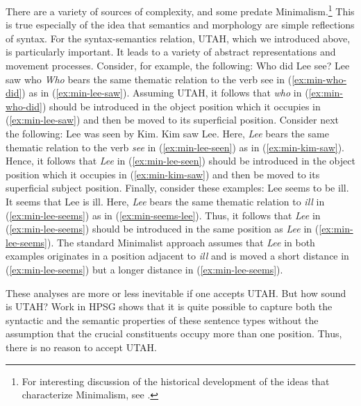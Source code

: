 \documentclass[output=paper]{langsci/langscibook}
\begin{document}
There are a variety of sources of complexity, and some predate Minimalism.\footnote{%
  For interesting discussion of the historical development of the ideas that characterize Minimalism, see \citet[Chapters~2 and~3]{CJ2005a}.%
}
This is true especially of the idea that semantics and morphology are simple reflections of syntax. For the syntax-semantics relation, UTAH, which we introduced above, is particularly important. It leads to a variety of abstract representations and movement processes. Consider, for example, the following:
\eal
\ex Who did Lee see?\label{ex:min-who-did} 
\ex Lee saw who\label{ex:min-lee-saw}
\zl
\textit{Who} bears the same thematic relation to the verb see in (\ref{ex:min-who-did}) as in (\ref{ex:min-lee-saw}). Assuming UTAH, it follows that \textit{who} in (\ref{ex:min-who-did}) should be introduced in the object position which it occupies in (\ref{ex:min-lee-saw}) and then be moved to its superficial position. Consider next the following:
\eal
\ex Lee was seen by Kim.\label{ex:min-lee-seen}
\ex Kim saw Lee.\label{ex:min-kim-saw}
\zl
Here, \textit{Lee} bears the same thematic relation to the verb \textit{see} in (\ref{ex:min-lee-seen}) as in (\ref{ex:min-kim-saw}). Hence, it follows that \textit{Lee} in (\ref{ex:min-lee-seen}) should be introduced in the object position which it occupies in (\ref{ex:min-kim-saw}) and then be moved to its superficial subject position. Finally, consider these examples:
\eal\label{ex:min-lee}
\ex Lee seems to be ill.\label{ex:min-lee-seems}
\ex It seems that Lee is ill.\label{ex:min-seems-lee}
\zl
Here, \textit{Lee} bears the same thematic relation to \textit{ill} in (\ref{ex:min-lee-seems}) as in (\ref{ex:min-seems-lee}). Thus, it follows that \textit{Lee} in (\ref{ex:min-lee-seems}) should be introduced in the same position as \textit{Lee} in (\ref{ex:min-lee-seems}). The standard Minimalist approach assumes that \textit{Lee} in both examples originates in a position adjacent to \textit{ill} and is moved a short distance in (\ref{ex:min-lee-seems}) but a longer distance in (\ref{ex:min-lee-seems}). 

These analyses are more or less inevitable if one accepts UTAH. But how sound is UTAH? Work in HPSG shows that it is quite possible to capture both the syntactic and the semantic properties of these sentence types without the assumption that the crucial constituents occupy more than one position. Thus, there is no reason to accept UTAH.
\end{document}
